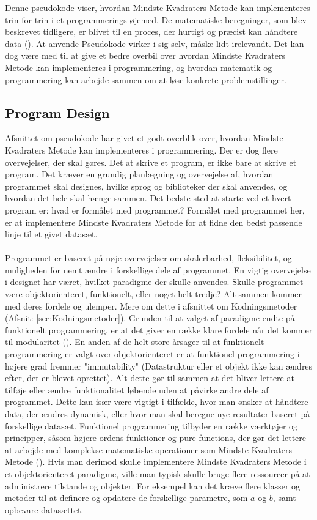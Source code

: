 Denne pseudokode viser, hvordan Mindste Kvadraters Metode kan implementeres trin for trin i et programmerings øjemed. De matematiske beregninger, som blev beskrevet tidligere, er blivet til en proces, der hurtigt og præcist kan håndtere data (\cite{codesansar}). At anvende Pseudokode virker i sig selv, måske lidt irelevandt. Det kan dog være med til at give et bedre overbil over hvordan Mindste Kvadraters Metode kan implementeres i programmering, og hvordan matematik og programmering kan arbejde sammen om at løse konkrete problemstillinger.

\subsection{Program Design}\label{sec:programDesign}
Afsnittet om pseudokode har givet et godt overblik over, hvordan Mindste Kvadraters Metode kan implementeres i programmering. Der er dog flere overvejelser, der skal gøres. Det at skrive et program, er ikke bare at skrive et program. Det kræver en grundig planlægning og overvejelse af, hvordan programmet skal designes, hvilke sprog og biblioteker der skal anvendes, og hvordan det hele skal hænge sammen. Det bedste sted at starte ved et hvert program er: hvad er formålet med programmet? Formålet med programmet her, er at implementere Mindste Kvadraters Metode for at fidne den bedst passende linje til et givet datasæt. \\\\ Programmet er baseret på nøje overvejelser om skalerbarhed, fleksibilitet, og muligheden for nemt ændre i forskellige dele af programmet. En vigtig overvejelse i designet har været, hvilket paradigme der skulle anvendes. Skulle programmet være objektorienteret, funktionelt, eller noget helt tredje? Alt sammen kommer med deres fordele og ulemper. Mere om dette i afsnittet om Kodningsmetoder (Afsnit: \ref{sec:Kodningsmetoder}). Grunden til at valget af paradigme endte på funktionelt programmering, er at det giver en række klare fordele når det kommer til modularitet (\cite{gupta}). En anden af de helt store årsager til at funktionelt programmering er valgt over objektorienteret er at funktionel programmering i højere grad fremmer "immutability" (Datastruktur eller et objekt ikke kan ændres efter, det er blevet oprettet). Alt dette gør til sammen at det bliver lettere at tilføje eller ændre funktionalitet løbende uden at påvirke andre dele af programmet. Dette kan især være vigtigt i tilfælde, hvor man ønsker at håndtere data, der ændres dynamisk, eller hvor man skal beregne nye resultater baseret på forskellige datasæt. Funktionel programmering tilbyder en række værktøjer og principper, såsom højere-ordens funktioner og pure functions, der gør det lettere at arbejde med komplekse matematiske operationer som Mindste Kvadraters Metode (\cite{funktionelProgrammering}). Hvis man derimod skulle implementere Mindste Kvadraters Metode i et objektorienteret paradigme, ville man typisk skulle bruge flere ressourcer på at administrere tilstande og objekter. For eksempel kan det kræve flere klasser og metoder til at definere og opdatere de forskellige parametre, som  $a$ og $b$, samt opbevare datasættet. \\  

